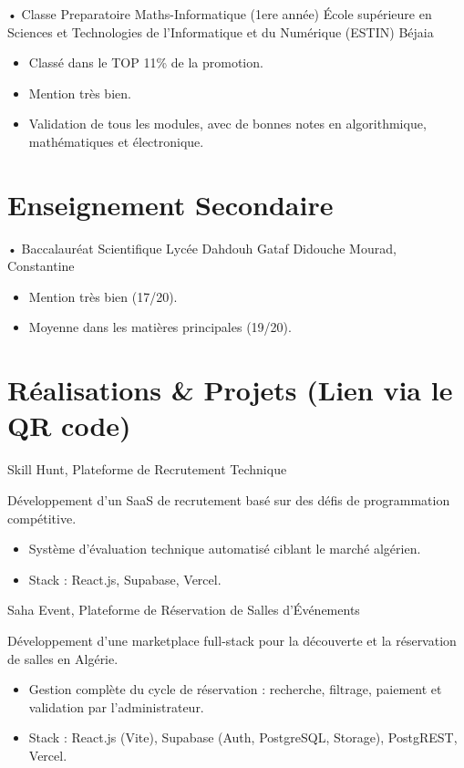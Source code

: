 \documentclass[11pt,a4paper,sans]{moderncv}
\begin{document}
  {• Classe Preparatoire Maths-Informatique (1ere année)}
  {École supérieure en Sciences et Technologies de l'Informatique et du Numérique (ESTIN)}
  {Béjaia}{}
  {%
    \begin{itemize}[label=•, leftmargin=1.5em, nosep]
      \item Classé dans le TOP 11\% de la promotion.
      \item Mention très bien.
      \item Validation de tous les modules, avec de bonnes notes en algorithmique, mathématiques et électronique.
    \end{itemize}
  }

\section{Enseignement Secondaire}

  {• Baccalauréat Scientifique}
  {Lycée Dahdouh Gataf}
  {Didouche Mourad, Constantine}{}
  {%
    \begin{itemize}[label=•, leftmargin=1.5em, nosep]
      \item Mention très bien (17/20).
      \item Moyenne dans les matières principales (19/20).
    \end{itemize}
  }

\section{Réalisations \& Projets \hfill \small\textnormal{(Lien via le QR code)}}

  {Skill Hunt, Plateforme de Recrutement Technique}
  {}
  {}{}
  {Développement d'un SaaS de recrutement basé sur des défis de programmation compétitive.
    \begin{itemize}[label=---, leftmargin=1.5em, nosep]
      \item Système d'évaluation technique automatisé ciblant le marché algérien.
      \item Stack : React.js, Supabase, Vercel.
    \end{itemize}
  }

  {Saha Event, Plateforme de Réservation de Salles d'Événements}
  {}
  {}{}
  {Développement d'une marketplace full-stack pour la découverte et la réservation de salles en Algérie.
    \begin{itemize}[label=---, leftmargin=1.5em, nosep]
      \item Gestion complète du cycle de réservation : recherche, filtrage, paiement et validation par l'administrateur.
      \item Stack : React.js (Vite), Supabase (Auth, PostgreSQL, Storage), PostgREST, Vercel.
    \end{itemize}
  }
\end{document}
